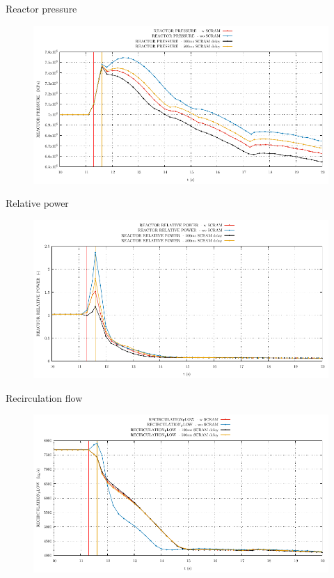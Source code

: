 \begin{frame}{Reactor pressure}
	\begin{figure}
		\centering
		\includegraphics[width=\textwidth]{./01PressureAccident/graphs/REACTOR PRESSURE _comp.pdf}
		
	\end{figure}
	
\end{frame}
%
%
\begin{frame}{Relative power}
	\begin{figure}
		\centering
		\includegraphics[width=\textwidth]{./01PressureAccident/graphs/REACTOR RELATIVE POWER _comp.pdf}
		
	\end{figure}
\end{frame}


%
\begin{frame}{Recirculation flow}
	\begin{figure}
		\centering
		\includegraphics[width=\textwidth]{./01PressureAccident/graphs/RECIRCULATION_FLOW _comp.pdf}
		
	\end{figure}
	
\end{frame}

